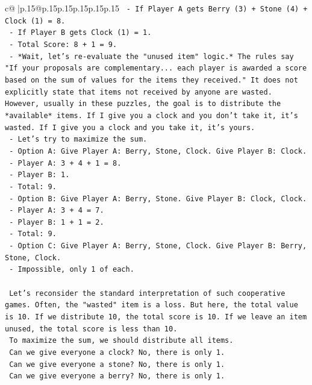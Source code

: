\documentclass{article}
\begin{document}
{\begin{supertabular}{c@{$\;$}|p{.15\linewidth}@{}p{.15\linewidth}p{.15\linewidth}p{.15\linewidth}p{.15\linewidth}p{.15\linewidth}}
{{{\texttt{    {-} If Player A gets Berry (3) + Stone (4) + Clock (1) = 8.} \\
\texttt{    {-} If Player B gets Clock (1) = 1.} \\
\texttt{    {-} Total Score: 8 + 1 = 9.} \\
\texttt{    {-} *Wait, let's re{-}evaluate the "unused item" logic.* The rules say "If your proposals are complementary... each player is awarded a score based on the sum of values for the items they received." It does not explicitly state that items not received by anyone are wasted. However, usually in these puzzles, the goal is to distribute the *available* items. If I give you a clock and you don't take it, it's wasted. If I give you a clock and you take it, it's yours.} \\
\texttt{    {-} Let's try to maximize the sum.} \\
\texttt{    {-} Option A: Give Player A: Berry, Stone, Clock. Give Player B: Clock.} \\
\texttt{        {-} Player A: 3 + 4 + 1 = 8.} \\
\texttt{        {-} Player B: 1.} \\
\texttt{        {-} Total: 9.} \\
\texttt{    {-} Option B: Give Player A: Berry, Stone. Give Player B: Clock, Clock.} \\
\texttt{        {-} Player A: 3 + 4 = 7.} \\
\texttt{        {-} Player B: 1 + 1 = 2.} \\
\texttt{        {-} Total: 9.} \\
\texttt{    {-} Option C: Give Player A: Berry, Stone, Clock. Give Player B: Berry, Stone, Clock.} \\
\texttt{        {-} Impossible, only 1 of each.} \\
\\ 
\texttt{    Let's reconsider the standard interpretation of such cooperative games. Often, the "wasted" item is a loss. But here, the total value is 10. If we distribute 10, the total score is 10. If we leave an item unused, the total score is less than 10.} \\
\texttt{    To maximize the sum, we should distribute all items.} \\
\texttt{    Can we give everyone a clock? No, there is only 1.} \\
\texttt{    Can we give everyone a stone? No, there is only 1.} \\
\texttt{    Can we give everyone a berry? No, there is only 1.} \\
}}}
\end{supertabular}}
\end{document}

